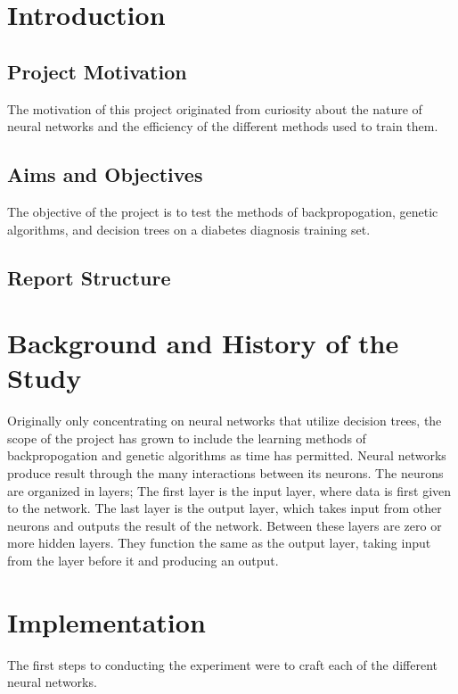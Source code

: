 \documentclass[12pt]{article}
\begin{document}
\maketitle

\section{Introduction}
    \subsection{Project Motivation}
        The motivation of this project originated from curiosity about the nature of neural 
        networks and the efficiency of the different methods used to train them.
    \subsection{Aims and Objectives}
        The objective of the project is to test the methods of backpropogation, genetic 
        algorithms, and decision trees on a diabetes diagnosis training set.
    \subsection{Report Structure}
\section{Background and History of the Study}
    Originally only concentrating on neural networks that utilize decision trees, 
    the scope of the project has grown to include the learning methods of backpropogation and 
    genetic algorithms as time has permitted.  Neural networks produce result through the many interactions 
    between its neurons.  The neurons are organized in layers; The first layer is the input layer, 
    where data is first given to the network.  The last layer is the output layer, which takes input 
    from other neurons and outputs the result of the network.  Between these layers are zero or more 
    hidden layers.  They function the same as the output layer, taking input from the layer before it 
    and producing an output.
\section{Implementation}
    The first steps to conducting the experiment were to craft each of the different neural networks. 
\end{document}
